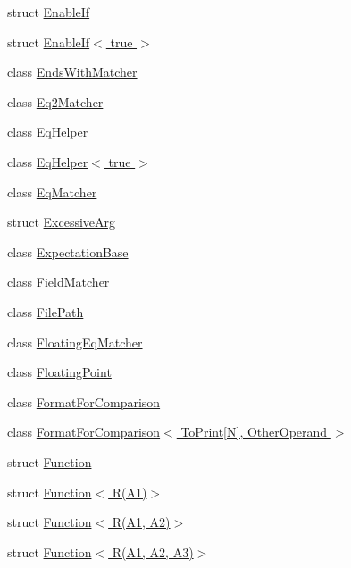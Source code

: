 \begin{DoxyCompactItemize}
\item 
struct \hyperlink{structtesting_1_1internal_1_1EnableIf}{Enable\+If}
\item 
struct \hyperlink{structtesting_1_1internal_1_1EnableIf_3_01true_01_4}{Enable\+If$<$ true $>$}
\item 
class \hyperlink{classtesting_1_1internal_1_1EndsWithMatcher}{Ends\+With\+Matcher}
\item 
class \hyperlink{classtesting_1_1internal_1_1Eq2Matcher}{Eq2\+Matcher}
\item 
class \hyperlink{classtesting_1_1internal_1_1EqHelper}{Eq\+Helper}
\item 
class \hyperlink{classtesting_1_1internal_1_1EqHelper_3_01true_01_4}{Eq\+Helper$<$ true $>$}
\item 
class \hyperlink{classtesting_1_1internal_1_1EqMatcher}{Eq\+Matcher}
\item 
struct \hyperlink{structtesting_1_1internal_1_1ExcessiveArg}{Excessive\+Arg}
\item 
class \hyperlink{classtesting_1_1internal_1_1ExpectationBase}{Expectation\+Base}
\item 
class \hyperlink{classtesting_1_1internal_1_1FieldMatcher}{Field\+Matcher}
\item 
class \hyperlink{classtesting_1_1internal_1_1FilePath}{File\+Path}
\item 
class \hyperlink{classtesting_1_1internal_1_1FloatingEqMatcher}{Floating\+Eq\+Matcher}
\item 
class \hyperlink{classtesting_1_1internal_1_1FloatingPoint}{Floating\+Point}
\item 
class \hyperlink{classtesting_1_1internal_1_1FormatForComparison}{Format\+For\+Comparison}
\item 
class \hyperlink{classtesting_1_1internal_1_1FormatForComparison_3_01ToPrint[N]_00_01OtherOperand_01_4}{Format\+For\+Comparison$<$ To\+Print\mbox{[}\+N\mbox{]}, Other\+Operand $>$}
\item 
struct \hyperlink{structtesting_1_1internal_1_1Function}{Function}
\item 
struct \hyperlink{structtesting_1_1internal_1_1Function_3_01R_07A1_08_4}{Function$<$ R(\+A1)$>$}
\item 
struct \hyperlink{structtesting_1_1internal_1_1Function_3_01R_07A1_00_01A2_08_4}{Function$<$ R(\+A1, A2)$>$}
\item 
struct \hyperlink{structtesting_1_1internal_1_1Function_3_01R_07A1_00_01A2_00_01A3_08_4}{Function$<$ R(\+A1, A2, A3)$>$}
\item 

\end{DoxyCompactItemize}

